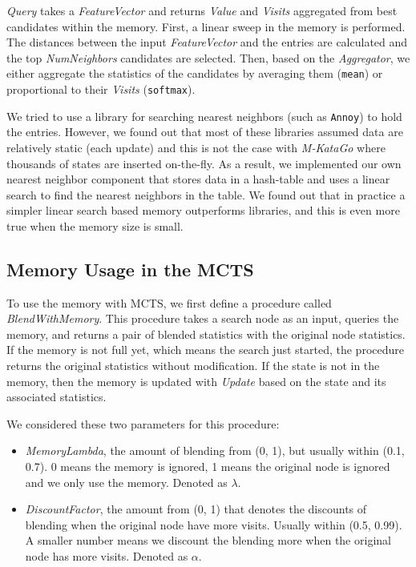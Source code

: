 \documentclass{article}
\newcommand{\mkatago}{\emph{M-KataGo}\xspace}
\begin{document}
\textit{Query} takes a \textit{FeatureVector} and returns \textit{Value} and \textit{Visits} aggregated from best candidates within the memory.
First, a linear sweep in the memory is performed.
The distances between the input \textit{FeatureVector} and the entries are calculated and the top \textit{NumNeighbors} candidates are selected.
Then, based on the \textit{Aggregator}, we either aggregate the statistics of the candidates by averaging them (\texttt{mean}) or proportional to their \textit{Visits} (\texttt{softmax}).

We tried to use a library for searching nearest neighbors (such as \texttt{Annoy}) to hold the entries.
However, we found out that most of these libraries assumed data are relatively static (each update) and this is not the case with \mkatago where thousands of states are inserted on-the-fly.
As a result, we implemented our own nearest neighbor component that stores data in a hash-table and uses a linear search to find the nearest neighbors in the table.
We found out that in practice a simpler linear search based memory outperforms libraries, and this is even more true when the memory size is small.

\subsection{Memory Usage in the MCTS}
To use the memory with MCTS, we first define a procedure called \textit{BlendWithMemory}.
This procedure takes a search node as an input, queries the memory, and returns a pair of blended statistics with the original node statistics.
If the memory is not full yet, which means the search just started, the procedure returns the original statistics without modification.
If the state is not in the memory, then the memory is updated with \textit{Update} based on the state and its associated statistics.

We considered these two parameters for this procedure:
\begin{itemize}
    \item \textit{MemoryLambda}, the amount of blending from (0, 1), but usually within (0.1, 0.7).
          0 means the memory is ignored, 1 means the original node is ignored and we only use the memory.
          Denoted as $\lambda$.
    \item \textit{DiscountFactor}, the amount from (0, 1) that denotes the discounts of blending when the original node have more visits.
          Usually within (0.5, 0.99).
          A smaller number means we discount the blending more when the original node has more visits.
          Denoted as $\alpha$.
\end{itemize}
\end{document}
